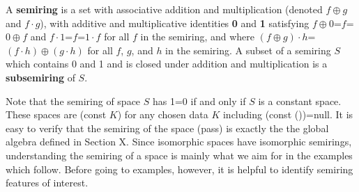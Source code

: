 \documentclass[11pt]{article}
\begin{document}
\begin{definition}
A {\bf semiring} is a set with associative addition and multiplication (denoted $f\oplus g$ and $f\cdot g$), with additive and 
multiplicative identities {\bf 0} and {\bf 1} satisfying $f\oplus 0$=$f$=$0\oplus f$ and $f\cdot 1$=$f$=$1\cdot f$ for all $f$ in the semiring, and where 
$(f\oplus g)\cdot h$=$(f\cdot h)\oplus (g\cdot h)$ for all $f$, $g$, and $h$ in the semiring.  
A subset of a semiring $S$ which contains 0 and 1 and is closed under addition and multiplication is a {\bf subsemiring} of $S$.   
\end{definition} 
\noindent 
Note that the semiring of space $S$ has 1=0 if and only if $S$ is a constant space.  These spaces 
are (const $K$) for any chosen data $K$ including (const ())=null.
It is easy to verify that the semiring of the space (pass) is exactly the the global algebra defined in Section X.  Since isomorphic spaces have 
isomorphic semirings, understanding the semiring of a space is mainly what we aim for in the examples which follow.  Before going to examples, however, it is helpful 
to identify semiring features of interest. 
\end{document}
